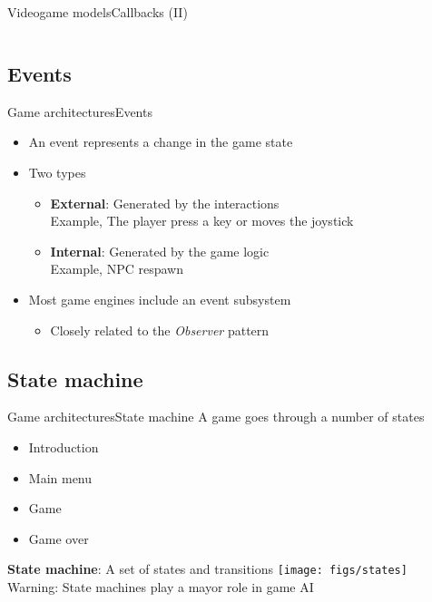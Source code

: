 \documentclass[10pt,compress]{beamer} %
\begin{document}
\begin{frame}{Videogame models}{Callbacks (II)}
	\vspace{-0.3cm}
    \begin{columns}
    		\begin{block}{}
	    	\vspace{-0.2cm}
	    	
			\vspace{-0.2cm}
			\end{block}
	\end{columns}
\end{frame}

\subsection{Events}
\begin{frame}{Game architectures}{Events}
	\begin{itemize}
		\item An event represents a change in the game state
		\item Two types
		\begin{itemize}
			\item \textbf{External}: Generated by the interactions\\Example, The player press a key or moves the joystick
			\item \textbf{Internal}: Generated by the game logic\\Example, NPC respawn
		\end{itemize}
		\item Most game engines include an event subsystem
		\begin{itemize}
			\item Closely related to the \textit{Observer} pattern
		\end{itemize}

	\end{itemize}
\end{frame}

\subsection{State machine}
\begin{frame}{Game architectures}{State machine}
	\vspace{-0.3cm}
	A game goes through a number of \alert{states}
		\begin{itemize}
			\item Introduction
			\item Main menu
			\item Game
			\item Game over
		\end{itemize}
	\textbf{State machine}: A set of states and transitions
	\vspace{0.3cm}
	\texttt{[image: figs/states]}\\
	\vspace{-0.2cm}
	Warning: State machines play a mayor role in game AI
\end{frame}
\end{document}
